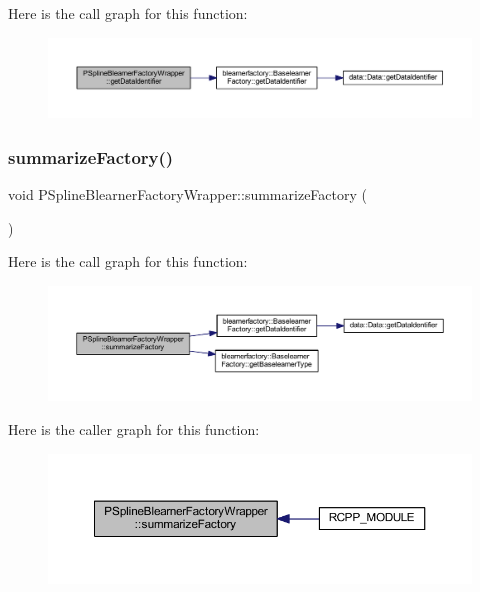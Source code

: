 Here is the call graph for this function\+:
\nopagebreak
\begin{figure}[H]
\begin{center}
\leavevmode
\includegraphics[width=350pt]{class_p_spline_blearner_factory_wrapper_a909646ea1efe420d71c8159ab2305fc8_cgraph}
\end{center}
\end{figure}
\mbox{\label{class_p_spline_blearner_factory_wrapper_a930b000d5fad67c58bade22c7cd54149}} 
\subsubsection{\texorpdfstring{summarize\+Factory()}{summarizeFactory()}}
{\footnotesize\ttfamily void P\+Spline\+Blearner\+Factory\+Wrapper\+::summarize\+Factory (\begin{DoxyParamCaption}{ }\end{DoxyParamCaption})\hspace{0.3cm}{\ttfamily [inline]}}

Here is the call graph for this function\+:
\nopagebreak
\begin{figure}[H]
\begin{center}
\leavevmode
\includegraphics[width=350pt]{class_p_spline_blearner_factory_wrapper_a930b000d5fad67c58bade22c7cd54149_cgraph}
\end{center}
\end{figure}
Here is the caller graph for this function\+:
\nopagebreak
\begin{figure}[H]
\begin{center}
\leavevmode
\includegraphics[width=350pt]{class_p_spline_blearner_factory_wrapper_a930b000d5fad67c58bade22c7cd54149_icgraph}
\end{center}
\end{figure}


